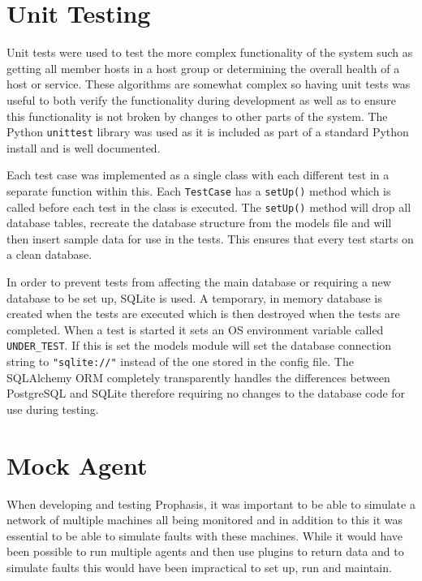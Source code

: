 \documentclass[bsc,deptreport,twoside,parskip,singlespacing,notimes]{infthesis}
\begin{document}
\section{Unit Testing}

	Unit tests were used to test the more complex functionality of the system such
	as getting all member hosts in a host group or determining the overall health
	of a host or service.  These algorithms are somewhat complex so having unit
	tests was useful to both verify the functionality during development as well
	as to ensure this functionality is not broken by changes to other parts of the
	system.  The Python \texttt{unittest} library was used as it is included as part of
	a standard Python install and is well documented.


	Each test case was implemented as a single class with each different test in a
	separate function within this.  Each \texttt{TestCase} has a \texttt{setUp()}
	method which is called before each test in the class is executed.  The
	\texttt{setUp()} method will drop all database tables, recreate the database
	structure from the models file and will then insert sample data for use in the
	tests.  This ensures that every test starts on a clean database.


	In order to prevent tests from affecting the main database or requiring a new
	database to be set up, SQLite is used.  A temporary, in memory database is
	created when the tests are executed which is then destroyed when the tests are
	completed.  When a test is started it sets an OS environment variable called
	\texttt{UNDER\_TEST}.  If this is set the models module will set the database
	connection string to \texttt{"sqlite://"} instead of the one stored in the config
	file. The SQLAlchemy ORM completely transparently handles the differences
	between PostgreSQL and SQLite therefore requiring no changes to the database
	code for use during testing.


\section{Mock Agent}

	When developing and testing Prophasis, it was important to be able to simulate a
	network of multiple machines all being monitored and in addition to this it
	was essential to be able to simulate faults with these machines. While it would
	have been possible to run multiple agents and then use plugins to return data
	and to simulate faults this would have been impractical to set up, run and maintain.
\end{document}
